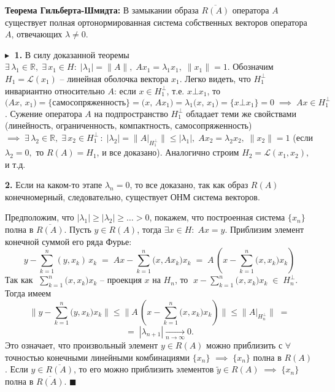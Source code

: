 \textbf{Теорема Гильберта-Шмидта:\;} В замыкании образа $\overline{R(A)}$ оператора $A$ существует полная ортонормированная система собственных векторов оператора $A$, отвечающих $\lambda \ne 0$.

$\blacktriangleright\;$
\textbf{1.} В силу доказанной теоремы $\exists \,\lambda_1 \in \mathbb{R}, \;\exists\,x_1\in H: \; |\lambda_1| = \|A\|, \; A x_1 = \lambda_1 x_1, \; \|x_1\| = 1$.
Обозначим $H_1 = \mathcal{L} (x_1)$ -- линейная оболочка вектора $x_1$. Легко видеть, что $H_1^\bot$ инвариантно относительно $A$: если $x \in H_1^\bot$, т.е. $x\bot x_1$, то $\displaystyle \big(A x,\,x_1\big) = \{\textit{самосопряженность}\}=\big(x,\, A x_1\big) = \lambda_1 \big(x,\,x_1\big) = \{ x\bot x_1\} = 0 \;\implies\; A x \in H_1^\bot$.
Сужение оператора $A$ на подпространство $H_1^\bot$ обладает теми же свойствами (линейность, ограниченность, компактность, самосопряженность) $\implies \; \exists \, \lambda_2 \in \mathbb{R}, \; \exists\,x_2 \in H_1^{\bot} \,: \; |\lambda_2| = \big\|A\big|_{H_1^\bot}\big\| \leq |\lambda_1|, \; Ax_2 = \lambda_2 x_2, \; \|x_2\| = 1$ (если $\lambda_2 = 0,$ то $R(A) = H_1$, и все доказано). Аналогично строим $H_2 = \mathcal{L}(x_1, x_2), $  и т.д.

\textbf{2.} Если на каком-то этапе $\lambda_n = 0$, то все доказано, так как образ $R(A)$ конечномерный, следовательно, существует ОНМ система векторов.

Предположим, что $|\lambda_1| \geq |\lambda_2| \geq\ldots> 0$, покажем, что построенная система $\{x_n\}$ полна в $\overline{R(A)}$. Пусть $y \in R(A)$, тогда $\exists x \in H: \; A x = y$. Приблизим элемент конечной суммой его ряда Фурье:
$$
y - \sum\limits_{k=1}^n (y, x_k) \, x_k \;=\; A x - \sum\limits_{k=1}^n \big(x, A x_k\big) x_k\; =\; A \,\left(x - \sum\limits_{k=1}^n \big(x, x_k\big) x_k \right)
$$
Так как $\displaystyle\;\sum\limits_{k=1}^n \big(x, x_k\big) x_k$ -- проекция $x$ на $H_n$, то $\;\displaystyle x - \sum\limits_{k=1}^n \big(x, x_k\big) x_k \;\in\; H_n^\bot $. Тогда имеем
$$
\bigg\| y - \sum\limits_{k=1}^n \big(y, x_k\big) x_k  \bigg\| \leq \bigg\| A \,\left(x - \sum\limits_{k=1}^n \big(x, x_k\big) x_k \right) \bigg\| \leq \big\|A\big|_{H_n^\bot}\big\| \;=$$
$$ =\; |\lambda_{n+1}| \xrightarrow[n\to\infty]{} 0.
$$
Это означает, что произвольный элемент $y\in R(A)$ можно приблизить с $\forall$ точностью конечными линейными комбинациями $\{x_n\}$ $\implies \;\{x_n\}$ полна в $R(A)$. Если $y \in \overline{R(A)}$, то его можно приблизить элементов $\widetilde{y} \in R(A)\; \implies \; \{x_n\}$\; полна в $\overline{R(A)}$. \; $\blacksquare$

